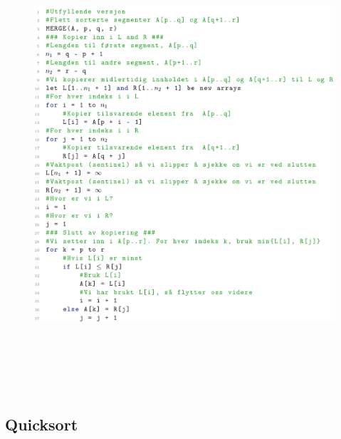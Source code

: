 \documentclass[12pt]{report}
\begin{document}
\begin{figure}[H]
	\begin{Center}
		\includegraphics[width=6.3in,height=6.59in]{./media/image168.png}
	\end{Center}
\end{figure}






\newpage
\par

\subsection*{Quicksort}


\end{document}
